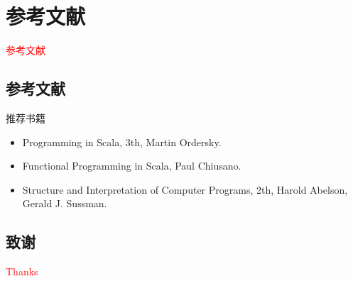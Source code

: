 \section{参考文献}
\label{sec:reference}

\begin{frame}
  \begin{center}
    \Huge{\textcolor{red}{参考文献}}
  \end{center}
\end{frame}

\subsection{参考文献}

\begin{frame}{推荐书籍}
    \begin{itemize}
    \item \alert{Programming in Scala, 3th}, Martin Ordersky.
    \item \alert{Functional Programming in Scala}, Paul Chiusano.
    \item \alert{Structure and Interpretation of Computer Programs, 2th}, Harold Abelson, Gerald J. Sussman.
    \end{itemize}
\end{frame}

\subsection{致谢}

\begin{frame}{}
  \begin{center}
    \Huge{\textcolor{red}{Thanks}}
  \end{center}
\end{frame}